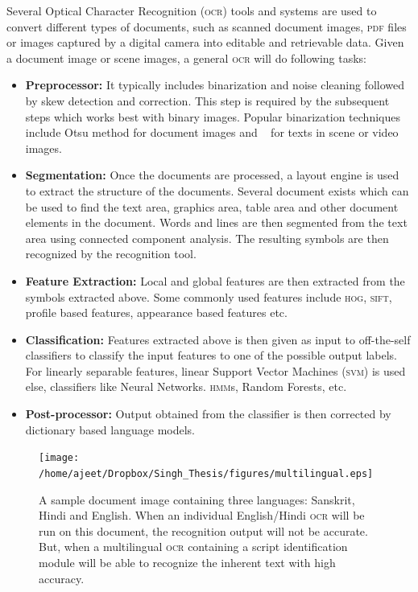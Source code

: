 Several Optical Character Recognition (\textsc{ocr}) tools and systems are used to convert different types of documents, such as scanned document images, \textsc{pdf} files or images captured by a digital camera into editable and retrievable data. Given a document image or scene images, a general \textsc{ocr} will do following tasks:
\begin{itemize}
\item \textbf{Preprocessor:} It typically includes binarization and noise cleaning followed by skew detection and correction. This step is required by the subsequent steps which works best with binary images. Popular binarization techniques include Otsu method for document images and ~\cite{Authors06b} for texts in scene or video images.
\item \textbf{Segmentation:} Once the documents are processed, a layout engine is used to extract the structure of the documents. Several document exists which can be used to find the text area, graphics area, table area and other document elements in the document. Words and lines are then segmented from the text area using connected component analysis. The resulting symbols are then recognized by the recognition tool.
\item \textbf{Feature Extraction:} Local and global features are then extracted from the symbols extracted above. Some commonly used features include \textsc{hog}, \textsc{sift}, profile based features, appearance based features etc.
\item \textbf{Classification:} Features extracted above is then given as input to off-the-self classifiers to classify the input features to one of the possible output labels. For linearly separable features, linear Support Vector Machines (\textsc{svm}) is used else, classifiers like Neural Networks. \textsc{hmm}s, Random Forests, etc.
\item \textbf{Post-processor:} Output obtained from the classifier is then corrected by dictionary based language models.
\end{itemize}

\begin{figure}[h]
\centering 
\texttt{[image: /home/ajeet/Dropbox/Singh\_Thesis/figures/multilingual.eps]}
\caption{A sample document image containing three languages: Sanskrit, Hindi and English. When an individual English/Hindi \textsc{ocr} will be run on this document, the recognition output will not be accurate. But, when a multilingual \textsc{ocr} containing a script identification module will be able to recognize the inherent text with high accuracy.}
\label{fig:motFig}
\end{figure}

